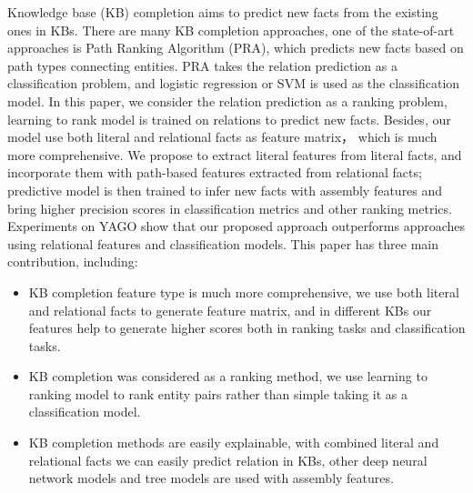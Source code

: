 
\begin{eabstract}
Knowledge base (KB) completion aims to predict new facts
from the existing ones in KBs. There are many KB completion approaches,
one of the state-of-art approaches is Path Ranking Algorithm
(PRA), which predicts new facts based on path types connecting entities.
PRA takes the relation prediction as a classification problem, and
logistic regression or SVM is used as the classification model. In this paper, we
consider the relation prediction as a ranking problem, learning to rank
model is trained on relations to predict new facts. Besides, our model
use both literal and relational facts as feature matrix， which is much more comprehensive. We propose to extract literal features from
literal facts, and incorporate them with path-based
features extracted from relational facts; predictive
model is then trained to infer new
facts with assembly features and bring higher precision scores in classification metrics and other ranking metrics. Experiments on YAGO show that our proposed approach outperforms approaches using
relational features and classification models.
This paper has three main contribution, including:
\begin{itemize}[$\bullet$]
    \item KB completion feature type is much more comprehensive, we use both literal and relational facts to generate feature matrix, and in different KBs our features help to generate higher scores both in ranking tasks and classification tasks.
    \item KB completion was considered as a ranking method, we use learning to ranking model to rank entity pairs rather than simple taking it as a classification model.
    \item KB completion methods are easily explainable, with combined literal and relational facts we can easily predict relation in KBs, other deep neural network models and tree models are used with assembly features.
  \end{itemize}

\end{eabstract}

